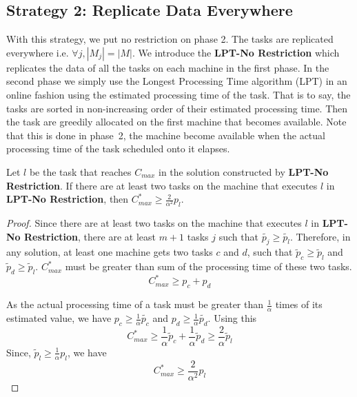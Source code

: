 \documentclass[twocolumn]{svjour3}
\begin{document}
\subsection{Strategy 2: Replicate Data Everywhere}\label{sec5}
\label{sec:rbm-allrep}

With this strategy, we put no restriction on phase 2. The tasks are
replicated everywhere i.e. $\forall j, |M_{j}|=|M|$. We introduce the
\textbf{LPT-No Restriction} which replicates the data of all the tasks
on each machine in the first phase. In the second phase we simply use
the Longest Processing Time algorithm (LPT) in an online fashion using
the estimated processing time of the task. That is to say, the tasks
are sorted in non-increasing order of their estimated processing
time. Then the task are greedily allocated on the first
machine that becomes available. Note that this is done in phase~2,
the machine become available when the actual processing time of
the task scheduled onto it elapses.

\begin{lemma}\label{No Restriction}
  Let $l$ be the task that reaches $C_{max}$ in the solution
  constructed by \textbf{LPT-No Restriction}. If there are at least two
  tasks on the machine that executes $l$ in \textbf{LPT-No Restriction}, then 
  $C_{max}^* \geq {\frac{2}{\alpha^{2}}} p_l$.
\end{lemma}
\begin{proof}
  Since there are at least two tasks on the machine that executes $l$
  in \textbf{LPT-No Restriction}, there are at least $m+1$ tasks $j$
  such that $\tilde{p_j} \geq \tilde{p_l}$. Therefore, in any solution,
  at least one machine gets two tasks $c$ and $d$, such that $\tilde
  p_c \geq \tilde p_l$ and $\tilde p_d \geq \tilde p_l$. $C_{max}^{*}$
  must be greater than sum of the processing time of these two tasks.
   \begin{equation}\nonumber
    C_{max}^{*}\geq p_c + p_d
  \end{equation}	

  As the actual processing time of a task must be greater than
  $\frac{1}{\alpha}$ times of its estimated value, we have $p_c \geq
  \frac{1}{\alpha}\tilde{p_c}$ and $p_d \geq
  \frac{1}{\alpha}\tilde{p_d}$. Using this
  \begin{equation}\nonumber 
    C_{max}^{*} \geq \frac{1}{\alpha}\tilde p_c +  \frac{1}{\alpha} \tilde p_d \geq \frac{2}{\alpha}\tilde p_l
  \end{equation}
Since, $\tilde p_l \geq \frac{1}{\alpha} p_l$, we have
  \begin{equation}\nonumber
    C_{max}^{*} \geq {\frac{2}{\alpha^{2}}} p_l 
  \end{equation}
\end{proof}
\end{document}
